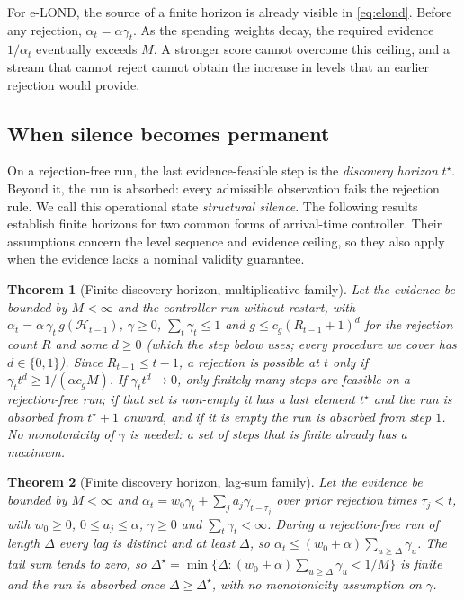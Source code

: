 \documentclass[conference]{IEEEtran}
\newtheorem{theorem}{Theorem}
\newcommand{\ceil}{M}
\newcommand{\alphat}{\alpha_t}
\begin{document}
For e-LOND, the source of a finite horizon is already visible in \eqref{eq:elond}. Before any
rejection, $\alphat=\alpha\gamma_t$. As the spending weights decay, the required evidence
$1/\alphat$ eventually exceeds $\ceil$. A stronger score cannot overcome this ceiling, and a stream
that cannot reject cannot obtain the increase in levels that an earlier rejection would provide.

\subsection{When silence becomes permanent}\label{sec:horizon}

On a rejection-free run, the last evidence-feasible step is the \emph{discovery horizon}
$t^\star$. Beyond it, the run is absorbed: every admissible observation fails the rejection rule.
We call this operational state \emph{structural silence}. The following results establish finite
horizons for two common forms of arrival-time controller. Their assumptions concern the level
sequence and evidence ceiling, so they also apply when the evidence lacks a nominal validity
guarantee.

\begin{theorem}[Finite discovery horizon, multiplicative family]\label{thm:family1}
Let the evidence be bounded by $\ceil<\infty$ and the controller run without restart, with
$\alphat=\alpha\,\gamma_t\,g(\mathcal H_{t-1})$, $\gamma\ge0$, $\sum_t\gamma_t\le1$ and
$g\le c_g(R_{t-1}+1)^d$ for the rejection count $R$ and some $d\ge0$ (which the step below uses; every
procedure we cover has $d\in\{0,1\}$). Since $R_{t-1}\le t-1$, a rejection is possible at
$t$ only if $\gamma_t t^d\ge1/(\alpha c_g\ceil)$. If $\gamma_t t^d\to0$, only finitely many steps are
feasible on a rejection-free run; if that set is non-empty it has a last element $t^{\star}$ and the run
is absorbed from $t^{\star}+1$ onward, and if it is empty the run is absorbed from step $1$. No monotonicity of $\gamma$ is needed: a set of steps that is
finite already has a maximum.
\end{theorem}

\begin{theorem}[Finite discovery horizon, lag-sum family]\label{thm:family2}
Let the evidence be bounded by $\ceil<\infty$ and
$\alphat=w_0\gamma_t+\sum_j a_j\gamma_{t-\tau_j}$ over prior rejection times $\tau_j<t$, with
$w_0\ge0$, $0\le a_j\le\alpha$, $\gamma\ge0$ and $\sum_t\gamma_t<\infty$. During a rejection-free run of length $\Delta$ every lag
is distinct and at least $\Delta$, so $\alphat\le(w_0+\alpha)\sum_{u\ge\Delta}\gamma_u$. The tail sum
tends to zero, so $\Delta^{\star}=\min\{\Delta:(w_0+\alpha)\sum_{u\ge\Delta}\gamma_u<1/\ceil\}$ is finite
and the run is absorbed once $\Delta\ge\Delta^{\star}$, with no monotonicity assumption on $\gamma$.
\end{theorem}
\end{document}
